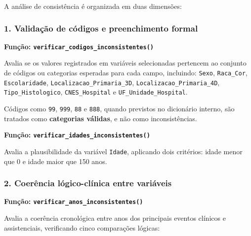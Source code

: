 \documentclass[
  brazilian,
  a4paper,
  oneside]{scrbook}
\begin{document}
A análise de consistência é organizada em duas dimensões:

\subsubsection{1. Validação de códigos e preenchimento
formal}\label{validauxe7uxe3o-de-cuxf3digos-e-preenchimento-formal}

\textbf{Função: \texttt{verificar\_codigos\_inconsistentes()}}

Avalia se os valores registrados em variáveis selecionadas pertencem ao
conjunto de códigos ou categorias esperadas para cada campo, incluindo:
\texttt{Sexo}, \texttt{Raca\_Cor}, \texttt{Escolaridade},
\texttt{Localizacao\_Primaria\_3D}, \texttt{Localizacao\_Primaria\_4D},
\texttt{Tipo\_Histologico}, \texttt{CNES\_Hospital} e
\texttt{UF\_Unidade\_Hospital}.

\begin{tcolorbox}[enhanced jigsaw, arc=.35mm, bottomrule=.15mm, bottomtitle=1mm, breakable, colback=white, colbacktitle=quarto-callout-note-color!10!white, colframe=quarto-callout-note-color-frame, coltitle=black, left=2mm, leftrule=.75mm, opacityback=0, opacitybacktitle=0.6, rightrule=.15mm, title=\textcolor{quarto-callout-note-color}{\faInfo}\hspace{0.5em}{Nota}, titlerule=0mm, toprule=.15mm, toptitle=1mm]

Códigos como \texttt{99}, \texttt{999}, \texttt{88} e \texttt{888},
quando previstos no dicionário interno, são tratados como
\textbf{categorias válidas}, e não como inconsistências.

\end{tcolorbox}

\textbf{Função: \texttt{verificar\_idades\_inconsistentes()}}

Avalia a plausibilidade da variável \texttt{Idade}, aplicando dois
critérios: idade menor que 0 e idade maior que 150 anos.

\subsubsection{2. Coerência lógico-clínica entre
variáveis}\label{coeruxeancia-luxf3gico-cluxednica-entre-variuxe1veis}

\textbf{Função: \texttt{verificar\_anos\_inconsistentes()}}

Avalia a coerência cronológica entre anos dos principais eventos
clínicos e assistenciais, verificando cinco comparações lógicas:
\end{document}
